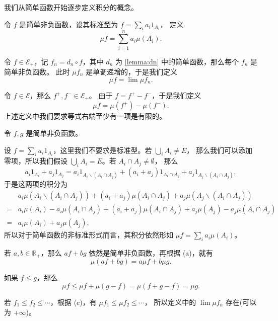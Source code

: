 \documentclass[fontset=none]{Notes}
\begin{document}
\begin{definition}
  我们从简单函数开始逐步定义积分的概念。
  \begin{alphenum}
    \item 令 $f$ 是简单非负函数，设其标准型为 $f=\sum_i a_i 1_{A_i}$，
    定义
    \[
      \mu f=\sum_{i=1}^n a_i\mu(A_i).  
    \]
    \item 令 $f\in \mathcal{E}_+$，记 $f_n=d_n\circ f$，其中 $d_n$
    为 \autoref{lemma:dn} 中的简单函数，那么每个 $f_n$ 是简单非负函数。
    此时 $\mu f_n$ 是单调递增的，于是我们定义
    \[
      \mu f=\lim \mu f_n.  
    \]
    \item 令 $f\in \mathcal{E}$，那么 $f^+,f^-\in \mathcal{E}_+$。
    由于 $f=f^+-f^-$，于是我们定义
    \[
      \mu f=\mu(f^+)-\mu (f^-).  
    \]
    上述定义中我们要求等式右端至少有一项是有限的。
  \end{alphenum}
\end{definition}
\begin{remark}
  令 $f,g$ 是简单非负函数。
  \begin{alphenum}
    \item 设 $f=\sum_i a_i 1_{A_i}$，这里我们不要求是标准型。若 $\bigcup_i A_i\neq E$，
    那么我们可以添加零项，所以我们假设 $\bigcup_i A_i=E$。若 $A_i\cap A_j\neq \emptyset$，
    那么
    \[
      a_i1_{A_i}+a_j1_{A_j}=
      a_i1_{A_i \smallsetminus (A_i\cap A_j)}+(a_i+a_j)1_{A_i\cap A_j}+a_j 1_{A_j \smallsetminus (A_i\cap A_j)},
    \]
    于是这两项的积分为
    \begin{align*}
      &a_i\mu(A_i \smallsetminus (A_i\cap A_j))+(a_i+a_j)\mu(A_i\cap A_j)+
      a_j\mu(A_j \smallsetminus (A_i\cap A_j))\\
      ={}& a_i\mu(A_i)-a_i\mu(A_i\cap A_j)+(a_i+a_j)\mu(A_i\cap A_j)+a_j\mu(A_j)
      -a_j\mu(A_i\cap A_j)\\
      ={}& a_i\mu(A_i)+a_j\mu(A_j),
    \end{align*}
    所以对于简单函数的非标准形式而言，其积分依然形如 $\mu f=\sum_i a_i\mu(A_i)$。
    \item 若 $a,b\in \mathbb{R}_+$，那么 $af+bg$ 依然是简单非负函数，再根据
    (a)，就有
    \[
      \mu(af+bg)=a\mu f+b\mu g.  
    \]
    \item 如果 $f\leq g$，那么
    \[
      \mu f\leq \mu f+\mu(g-f)=\mu(f+g-f)=\mu g.
    \]
    \item 若 $f_1\leq f_2\leq\cdots$，根据 (c)，有 $\mu f_1\leq\mu f_2\leq \cdots$，
    所以定义中的 $\lim \mu f_n$ 存在(可以为 $+\infty$)。
  \end{alphenum}
\end{remark}
\end{document}

